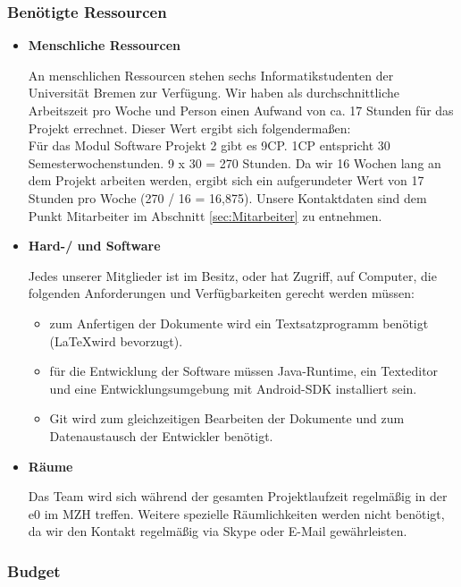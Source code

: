 \documentclass[fontsize=12pt,paper=a4,twoside]{scrartcl}
\begin{document}
\subsubsection{Benötigte Ressourcen}

\begin{itemize}
\item \textbf{Menschliche Ressourcen}

An menschlichen Ressourcen stehen sechs Informatikstudenten der Universität Bremen zur Verfügung. Wir haben als durchschnittliche Arbeitszeit pro Woche und Person einen Aufwand von ca. 17 Stunden für das Projekt errechnet. Dieser Wert ergibt sich folgendermaßen:\\
\newpage Für das Modul Software Projekt 2 gibt es 9CP. 1CP entspricht 30 Semesterwochenstunden. 9 x 30 = 270 Stunden. Da wir 16 Wochen lang an dem Projekt arbeiten werden, ergibt sich ein aufgerundeter Wert von 17 Stunden pro Woche (270 / 16 = 16,875). Unsere Kontaktdaten sind dem Punkt Mitarbeiter im Abschnitt \ref{sec:Mitarbeiter} zu entnehmen.

\item \textbf{Hard-/ und Software}

Jedes unserer Mitglieder ist im Besitz, oder hat Zugriff, auf Computer, die folgenden Anforderungen und Verfügbarkeiten gerecht werden müssen:

\begin{itemize}
\item zum Anfertigen der Dokumente wird ein Textsatzprogramm benötigt (\LaTeX wird bevorzugt).
\item für die Entwicklung der Software müssen Java-Runtime, ein Texteditor und eine Entwicklungsumgebung mit Android-SDK installiert sein.
\item Git wird zum gleichzeitigen Bearbeiten der Dokumente und zum Datenaustausch der Entwickler benötigt.
\end{itemize}

\item \textbf{Räume}

Das Team wird sich während der gesamten Projektlaufzeit regelmäßig in der e0 im MZH treffen. Weitere spezielle Räumlichkeiten werden nicht benötigt, da wir den Kontakt regelmäßig via Skype oder E-Mail gewährleisten.

\end{itemize}

\subsubsection{Budget}
\end{document}
